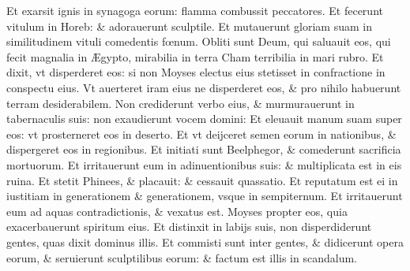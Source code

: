 \documentclass[a5paper,10pt]{book}
\def\AE{Æ}
\def\oe{œ}
\begin{document}
\begin{multicols*}{2}
\newline \color{red} E\color{black}t exarsit ignis in synagoga eorum: flamma combussit peccatores.
\newline \color{red} E\color{black}t fecerunt vitulum in Horeb: \& adorauerunt sculptile.
\newline \color{red} E\color{black}t mutauerunt gloriam suam in similitudinem vituli comedentis f\oe num.
\newline \color{red} O\color{black}bliti sunt Deum, qui saluauit eos, qui fecit magnalia in \AE gypto, mirabilia in terra Cham terribilia in mari rubro.
\newline \color{red} E\color{black}t dixit, vt disperderet eos: si non Moyses electus eius stetisset in confractione in conspectu eius.
\newline \color{red} V\color{black}t auerteret iram eius ne disperderet eos, \& pro nihilo habuerunt terram desiderabilem.
\newline \color{red} N\color{black}on crediderunt verbo eius, \& murmurauerunt in tabernaculis suis: non exaudierunt vocem domini:
\newline \color{red} E\color{black}t eleuauit manum suam super eos: vt prosterneret eos in deserto.
\newline \color{red} E\color{black}t vt deijceret semen eorum in nationibus, \& dispergeret eos in regionibus.
\newline \color{red} E\color{black}t initiati sunt Beelphegor, \& comederunt sacrificia mortuorum.
\newline \color{red} E\color{black}t irritauerunt eum in adinuentionibus suis: \& multiplicata est in eis ruina.
\newline \color{red} E\color{black}t stetit Phinees, \& placauit: \& cessauit quassatio.
\newline \color{red} E\color{black}t reputatum est ei in iustitiam in generationem \& generationem, vsque in sempiternum.
\newline \color{red} E\color{black}t irritauerunt eum ad aquas contradictionis, \& vexatus est.
\newline \color{red} M\color{black}oyses propter eos, quia exacerbauerunt spiritum eius.
\newline \color{red} E\color{black}t distinxit in labijs suis, non disperdiderunt gentes, quas dixit dominus illis.
\newline \color{red} E\color{black}t commisti sunt inter gentes, \& didicerunt opera eorum, \& seruierunt sculptilibus eorum: \& factum est illis in scandalum.

\end{multicols*}
\end{document}
